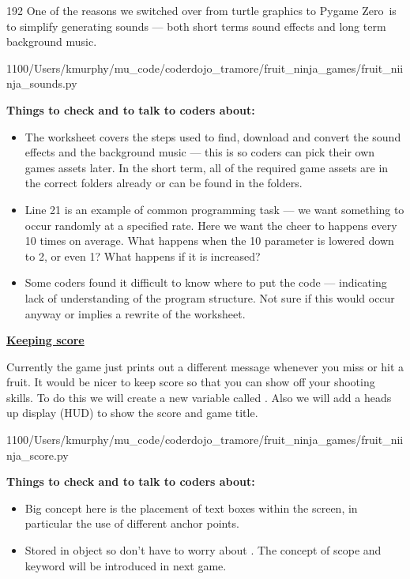 \documentclass{coderdojo}
\def\MUcode{/Users/kmurphy/mu_code/coderdojo_tramore/fruit_ninja_games/}
\def\pygameZero{{\pygameZeroFont Pygame Zero}}
\newcommand\contentsitem[2]{
	\item \hyperref[#1]{\color{section}\bfseries #2}
}
\begin{document}
\begin{dingautolist}{192}
\enlargethispage{40pt}
One of the reasons we switched over from turtle graphics to \pygameZero\ is to simplify generating sounds --- both short terms sound effects and long term background music. 

	{1}{100}{\MUcode}{fruit_niinja_sounds.py}  

{\bf Things to check and to talk to coders about:}

\begin{itemize}
\item The worksheet covers the steps used to find, download and convert the sound effects and the background music --- this is so coders can pick their own games assets later.  In the short term, all of the required game assets are in the correct folders already or can be found in the  folders.
\item 
Line 21 is an example of common programming task --- we want something to occur randomly at a specified rate. Here we want the cheer to happens every 10 times on average. What happens when the 10 parameter is lowered down to 2, or even 1? What happens if it is increased? 
\item
Some coders found it difficult to know where to put the code --- indicating lack of understanding of the program structure. Not sure if this would occur anyway or implies a rewrite of the worksheet.
\end{itemize}

\clearpage

\enlargethispage{40pt}
\vspace*{-30pt}
\contentsitem{rectangle}{Keeping score}

Currently the game just prints out a different message whenever you miss or hit a fruit. It would be nicer to keep score so that you can show off your shooting skills.  To do this we will create a new variable called .  Also we will add a heads up display (HUD) to show the score and game title.    

\vspace{-12pt}
	{1}{100}{\MUcode}{fruit_niinja_score.py}  

{\bf Things to check and to talk to coders about:}

\begin{itemize}
\item
Big concept here is the placement of text boxes within the screen, in particular the use of different anchor points.
\item 
Stored  in object  so don't have to worry about . The concept of scope and  keyword  will be introduced in next game.
\end{itemize}
	

\end{dingautolist}
\end{document}
